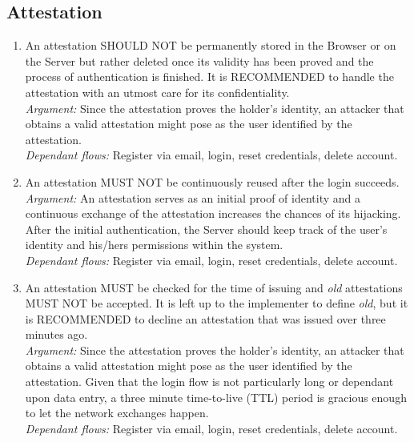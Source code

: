     \subsection{Attestation}
        \begin{enumerate}
                \item An attestation SHOULD NOT be permanently stored in the Browser or on the Server but rather deleted once
                    its validity has been proved and the process of authentication is finished. It is RECOMMENDED to handle 
                    the attestation with an utmost care for its confidentiality.\\
                \textit{Argument:} Since the attestation proves the holder's identity, an attacker that obtains a valid
                                attestation might pose as the user identified by the attestation.\\
                \textit{Dependant flows:} Register via email, login, reset credentials, delete account.  

                \item An attestation MUST NOT be continuously reused after the login succeeds.\\
                \textit{Argument:} An attestation serves as an initial proof of identity and a continuous exchange of the
                                attestation increases the chances of its hijacking. After the initial authentication, the
                                Server should keep track of the user's identity and his/hers permissions within the system.\\
                \textit{Dependant flows:} Register via email, login, reset credentials, delete account.  

                \item An attestation MUST be checked for the time of issuing and \textit{old} attestations MUST NOT be
                    accepted. It is left up to the implementer to define \textit{old}, but it is RECOMMENDED to
                    decline an attestation that was issued over three minutes ago.\\
                \textit{Argument:} Since the attestation proves the holder's identity, an attacker that obtains a valid
                                attestation might pose as the user identified by the attestation. Given that the login
                                flow is not particularly long or dependant upon data entry, a three minute time-to-live 
                                (TTL) period is gracious enough to let the network exchanges happen.\\
                \textit{Dependant flows:} Register via email, login, reset credentials, delete account. 
        \end{enumerate}
    

